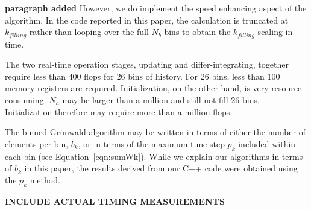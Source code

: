 {\bf paragraph added}
However, we do implement the speed enhancing aspect of the algorithm. In the code reported in this paper, the calculation is truncated at $k_{filling}$ rather than looping over the full $N_b$ bins to obtain the $k_{filling}$ scaling in time. 

The two real-time operation stages, updating and differ-integrating,
together require less than $400$ flops for $26$ bins of
history. For $26$ bins, less than $100$ memory registers are
required. Initialization, on the other hand, is very
resource-consuming. $N_h$ may be larger than a million and still not
fill $26$ bins. Initialization therefore may require more than a
million flops.

The binned Gr{\"u}nwald algorithm may be written in terms of either the
number of elements per bin, $b_k$, or in terms of the maximum time
step $p_k$ included within each bin (see
Equation~\ref{eqn:sumWk}). While we explain our algorithms in terms of
$b_k$ in this paper, the results derived from our C++ code were
obtained using the $p_k$ method.

{\bf INCLUDE ACTUAL TIMING MEASUREMENTS}
